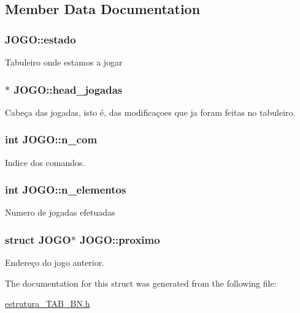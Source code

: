 \subsection{Member Data Documentation}
\hypertarget{structJOGO_a8be710a209c24ac0f77dc6ec345131c0}{
\subsubsection[{estado}]{ J\-O\-G\-O\-::estado}}\label{structJOGO_a8be710a209c24ac0f77dc6ec345131c0}
Tabuleiro onde estamos a jogar \hypertarget{structJOGO_ae6a10fd45e48577ebe24ce85f0d3ce66}{
\subsubsection[{head\-\_\-jogadas}]{$\ast$ J\-O\-G\-O\-::head\-\_\-jogadas}}\label{structJOGO_ae6a10fd45e48577ebe24ce85f0d3ce66}
Cabeça das jogadas, isto é, das modificaçoes que ja foram feitas no tabuleiro. \hypertarget{structJOGO_a8a2e1124aa5a80bca5be947df1d1d5e4}{
\subsubsection[{n\-\_\-com}]{\setlength{\rightskip}{0pt plus 5cm}int J\-O\-G\-O\-::n\-\_\-com}}\label{structJOGO_a8a2e1124aa5a80bca5be947df1d1d5e4}
Indice dos comandos. \hypertarget{structJOGO_a207d5e6dc2e307c6ecabe6d593b06a35}{
\subsubsection[{n\-\_\-elementos}]{\setlength{\rightskip}{0pt plus 5cm}int J\-O\-G\-O\-::n\-\_\-elementos}}\label{structJOGO_a207d5e6dc2e307c6ecabe6d593b06a35}
Numero de jogadas efetuadas \hypertarget{structJOGO_a2657c0fd23964f1adde229f158aa73bd}{
\subsubsection[{proximo}]{\setlength{\rightskip}{0pt plus 5cm}struct {\bf J\-O\-G\-O}$\ast$ J\-O\-G\-O\-::proximo}}\label{structJOGO_a2657c0fd23964f1adde229f158aa73bd}
Endereço do jogo anterior. 

The documentation for this struct was generated from the following file\-:\begin{DoxyCompactItemize}
\item 
\hyperlink{estrutura__TAB__BN_8h}{estrutura\-\_\-\-T\-A\-B\-\_\-\-B\-N.\-h}\end{DoxyCompactItemize}
